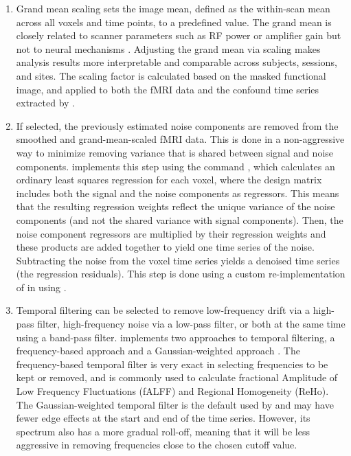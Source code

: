 \begin{enumerate}[leftmargin=*]
\item\label{itm:grandmean}

Grand mean scaling sets the image mean, defined as the within-scan mean across all voxels and time points, to a predefined value. The grand mean is closely related to scanner parameters such as RF power or amplifier gain but not to neural mechanisms \parencite{gavrilescu2002}. Adjusting the grand mean via scaling makes analysis results more interpretable and comparable across subjects, sessions, and sites. The scaling factor is calculated based on the masked functional image, and applied to both the fMRI data and the confound time series extracted by .

\item\label{itm:aroma}

If selected, the previously estimated  noise components are removed from the smoothed and grand-mean-scaled fMRI data. This is done in a non-aggressive way to minimize removing variance that is shared between signal and noise components.  implements this step using the  command , which calculates an ordinary least squares regression for each voxel, where the design matrix includes both the signal and the noise components as regressors. This means that the resulting regression weights reflect the unique variance of the noise components (and not the shared variance with signal components). Then, the noise component regressors are multiplied by their regression weights and these products are added together to yield one time series of the noise. Subtracting the noise from the voxel time series yields a denoised time series (the regression residuals). This step is done using a custom re-implementation of  in  using  \parencite{harris2020}.

\item\label{itm:tempfilt}

Temporal filtering can be selected to remove low-frequency drift via a high-pass filter, high-frequency noise via a low-pass filter, or both at the same time using a band-pass filter.  implements two approaches to temporal filtering, a frequency-based approach \parencite{jo2013} and a Gaussian-weighted approach \parencite{marchini2000}. The frequency-based temporal filter is very exact in selecting frequencies to be kept or removed, and is commonly used to calculate fractional Amplitude of Low Frequency Fluctuations (fALFF) and Regional Homogeneity (ReHo). The Gaussian-weighted temporal filter is the default used by  \parencite{jenkinson2012} and may have fewer edge effects at the start and end of the time series. However, its spectrum also has a more gradual roll-off, meaning that it will be less aggressive in removing frequencies close to the chosen cutoff value.

\end{enumerate}


